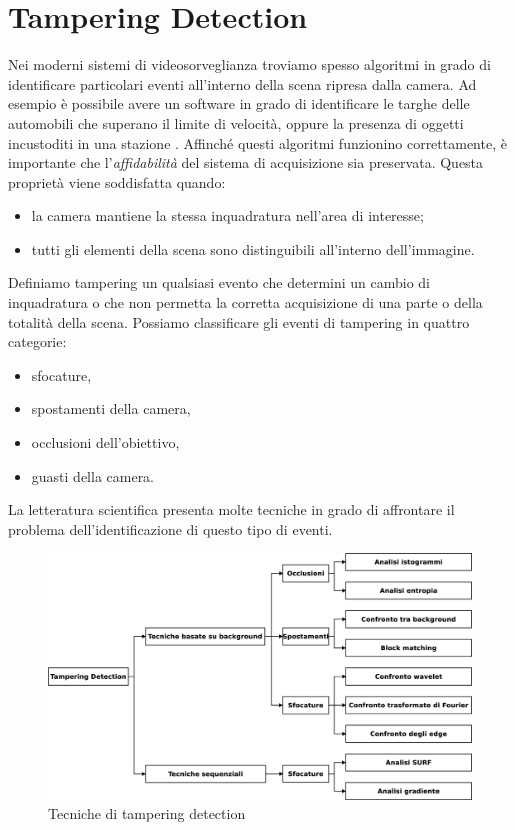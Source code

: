 \section{Tampering Detection}
\label{tamperingSOA}
Nei moderni sistemi di videosorveglianza troviamo spesso algoritmi in grado di identificare particolari eventi all'interno della scena ripresa dalla camera. 
Ad esempio \`e possibile avere un software in grado di identificare le targhe delle automobili che superano il limite di velocit\`a, oppure la presenza di oggetti incustoditi in una stazione \cite{Targhe}.
Affinch\'e questi algoritmi funzionino correttamente, \`e importante che l'\textit{affidabilit\`a} del sistema di acquisizione sia preservata.
Questa propriet\`a viene soddisfatta quando:
\begin{itemize}
	\item la camera mantiene la stessa inquadratura nell'area di interesse;
	\item tutti gli elementi della scena sono distinguibili all'interno dell'immagine.
\end{itemize}
Definiamo \gls{tampering} un qualsiasi evento che determini un cambio di inquadratura o che non permetta la corretta acquisizione di una parte o della totalit\`a della scena.
Possiamo classificare gli eventi di tampering in quattro categorie:
\begin{itemize}
	\item sfocature,
	\item spostamenti della camera,
	\item occlusioni dell'obiettivo,
	\item guasti della camera.
\end{itemize}
La letteratura scientifica presenta molte tecniche in grado di affrontare il problema dell'identificazione di questo tipo di eventi.
\begin{figure}
	\centering
	\includegraphics[width=12cm]{./diagrammi/tecnicheSOA.eps}
	\caption{Tecniche di tampering detection}
	\label{fig:tamperingSOA}
\end{figure}
